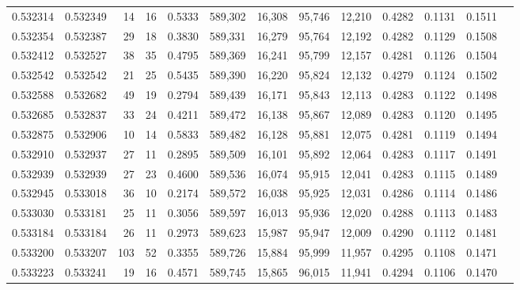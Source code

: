 \begin{tabular}{rrrrrrrrrrrrr}
0.532314 & 0.532349 &    14 &    16 &                                     0.5333 & 589,302 &  16,308 &  95,746 &  12,210 & 0.4282 & 0.1131 & 0.1511 \\
0.532354 & 0.532387 &    29 &    18 &                                     0.3830 & 589,331 &  16,279 &  95,764 &  12,192 & 0.4282 & 0.1129 & 0.1508 \\
0.532412 & 0.532527 &    38 &    35 &                                     0.4795 & 589,369 &  16,241 &  95,799 &  12,157 & 0.4281 & 0.1126 & 0.1504 \\
0.532542 & 0.532542 &    21 &    25 &                                     0.5435 & 589,390 &  16,220 &  95,824 &  12,132 & 0.4279 & 0.1124 & 0.1502 \\
0.532588 & 0.532682 &    49 &    19 &                                     0.2794 & 589,439 &  16,171 &  95,843 &  12,113 & 0.4283 & 0.1122 & 0.1498 \\
0.532685 & 0.532837 &    33 &    24 &                                     0.4211 & 589,472 &  16,138 &  95,867 &  12,089 & 0.4283 & 0.1120 & 0.1495 \\
0.532875 & 0.532906 &    10 &    14 &                                     0.5833 & 589,482 &  16,128 &  95,881 &  12,075 & 0.4281 & 0.1119 & 0.1494 \\
0.532910 & 0.532937 &    27 &    11 &                                     0.2895 & 589,509 &  16,101 &  95,892 &  12,064 & 0.4283 & 0.1117 & 0.1491 \\
0.532939 & 0.532939 &    27 &    23 &                                     0.4600 & 589,536 &  16,074 &  95,915 &  12,041 & 0.4283 & 0.1115 & 0.1489 \\
0.532945 & 0.533018 &    36 &    10 &                                     0.2174 & 589,572 &  16,038 &  95,925 &  12,031 & 0.4286 & 0.1114 & 0.1486 \\
0.533030 & 0.533181 &    25 &    11 &                                     0.3056 & 589,597 &  16,013 &  95,936 &  12,020 & 0.4288 & 0.1113 & 0.1483 \\
0.533184 & 0.533184 &    26 &    11 &                                     0.2973 & 589,623 &  15,987 &  95,947 &  12,009 & 0.4290 & 0.1112 & 0.1481 \\
0.533200 & 0.533207 &   103 &    52 &                                     0.3355 & 589,726 &  15,884 &  95,999 &  11,957 & 0.4295 & 0.1108 & 0.1471 \\
0.533223 & 0.533241 &    19 &    16 &                                     0.4571 & 589,745 &  15,865 &  96,015 &  11,941 & 0.4294 & 0.1106 & 0.1470 \\

\end{tabular}
